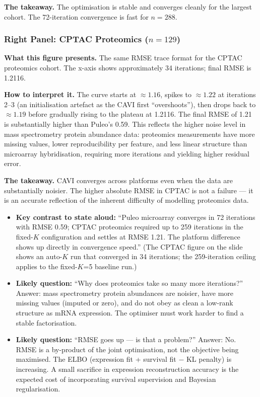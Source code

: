 \documentclass[11pt]{article}
\newcommand{\sectionlabel}[1]{\textbf{#1}}
\begin{document}
\textbf{The takeaway.} The optimisation is stable and converges cleanly for the largest cohort. The 72-iteration convergence is fast for $n = 288$.

\subsubsection*{Right Panel: CPTAC Proteomics ($n = 129$)}

\textbf{What this figure presents.} The same RMSE trace format for the CPTAC proteomics cohort. The x-axis shows approximately 34 iterations; final RMSE is 1.2116.

\textbf{How to interpret it.} The curve starts at $\approx 1.16$, spikes to $\approx 1.22$ at iterations 2--3 (an initialisation artefact as the CAVI first ``overshoots''), then drops back to $\approx 1.19$ before gradually rising to the plateau at 1.2116. The final RMSE of 1.21 is substantially higher than Puleo's 0.59. This reflects the higher noise level in mass spectrometry protein abundance data: proteomics measurements have more missing values, lower reproducibility per feature, and less linear structure than microarray hybridisation, requiring more iterations and yielding higher residual error.

\textbf{The takeaway.} CAVI converges across platforms even when the data are substantially noisier. The higher absolute RMSE in CPTAC is not a failure --- it is an accurate reflection of the inherent difficulty of modelling proteomics data.

\begin{itemize}
  \item \sectionlabel{Key contrast to state aloud:} ``Puleo microarray converges in 72 iterations with RMSE 0.59; CPTAC proteomics required up to 259 iterations in the fixed-$K$ configuration and settles at RMSE 1.21. The platform difference shows up directly in convergence speed.'' (The CPTAC figure on the slide shows an auto-$K$ run that converged in 34 iterations; the 259-iteration ceiling applies to the fixed-$K$=5 baseline run.)
  \item \sectionlabel{Likely question:} ``Why does proteomics take so many more iterations?'' Answer: mass spectrometry protein abundances are noisier, have more missing values (imputed or zero), and do not obey as clean a low-rank structure as mRNA expression. The optimiser must work harder to find a stable factorisation.
  \item \sectionlabel{Likely question:} ``RMSE goes up --- is that a problem?'' Answer: No. RMSE is a by-product of the joint optimisation, not the objective being maximised. The ELBO (expression fit + survival fit $-$ KL penalty) is increasing. A small sacrifice in expression reconstruction accuracy is the expected cost of incorporating survival supervision and Bayesian regularisation.
\end{itemize}
\end{document}

